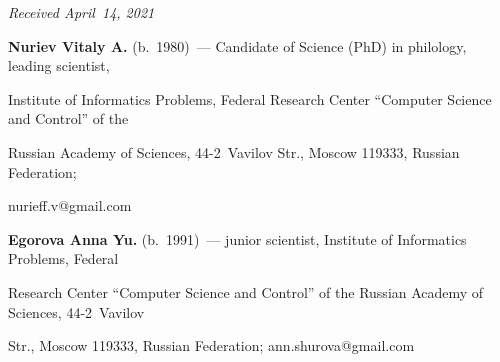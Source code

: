 \vspace*{-3pt}





  \hfill{\small\textit{Received April~14, 2021}}


















\Contr





\noindent


\textbf{Nuriev Vitaly A.} (b.\ 1980)~--- Candidate of Science (PhD) in philology, leading scientist, 


Institute of Informatics Problems, Federal Research Center ``Computer Science and Control'' of the 


Russian Academy of Sciences, 44-2~Vavilov Str., Moscow 119333, Russian Federation; 


\mbox{nurieff.v@gmail.com}





\vspace*{3pt}





\noindent


\textbf{Egorova Anna Yu.} (b.\ 1991)~--- junior scientist, Institute of Informatics Problems, Federal 


Research Center ``Computer Science and Control'' of the Russian Academy of Sciences, 44-2~Vavilov 


Str., Moscow 119333, Russian Federation; \mbox{ann.shurova@gmail.com}


   


\label{end\stat}





\renewcommand{\bibname}{\protect\rm Литература}


